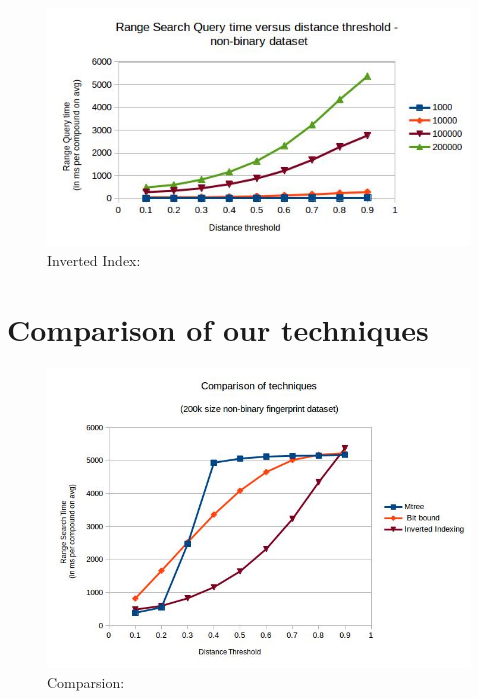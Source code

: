 \begin{figure}[ht]	
\centering
\includegraphics[width=1 \columnwidth]{img/imageI3.jpg}
\caption{Inverted Index: }
\label{fig:5I3}
\end{figure}




\section{Comparison of our techniques}





\begin{figure}[ht]	
\centering
\includegraphics[width=1 \columnwidth]{img/imageC1.jpg}
\caption{Comparsion: }
\label{fig:5I1}
\end{figure}


